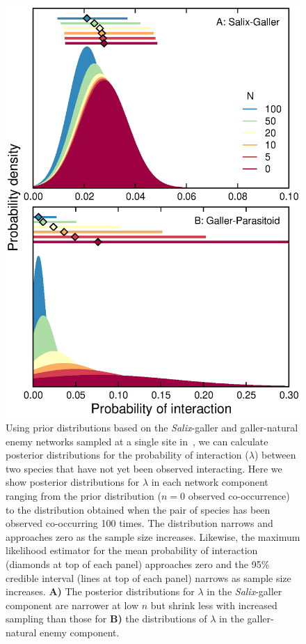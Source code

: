 \documentclass[12pt]{article}
\begin{document}
  \begin{figure}[h!]
    \caption{Using prior distributions based on the \emph{Salix}-galler and galler-natural enemy networks sampled at a single site in~\citet{Kopelke2017}, we can calculate posterior distributions for the probability of interaction ($\lambda$) between two species that have not yet been observed interacting. Here we show posterior distributions for $\lambda$ in each network component ranging from the prior distribution ($n=0$ observed co-occurrence) to the distribution obtained when the pair of species has been observed co-occurring 100 times. The distribution narrows and approaches zero as the sample size increases. Likewise, the maximum likelihood estimator for the mean probability of interaction (diamonds at top of each panel) approaches zero and the 95\% credible interval (lines at top of each panel) narrows as sample size increases. \textbf{A)} The posterior distributions for $\lambda$ in the \emph{Salix}-galler component are narrower at low $n$ but shrink less with increased sampling than those for \textbf{B)} the distributions of $\lambda$ in the galler-natural enemy component.}
    \label{Salix_pdfs}
    \begin{center}
    \includegraphics*[width=.7\textwidth]{figures/Salix_Galler_pdfs_increasing_N_Zillis.eps}
    \end{center}
    \end{figure}
\end{document}
